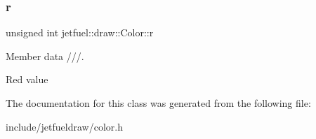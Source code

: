 \subsubsection{\texorpdfstring{r}{r}}
{\footnotesize\ttfamily unsigned int jetfuel\+::draw\+::\+Color\+::r}



Member data ///. 

Red value 

The documentation for this class was generated from the following file\+:\begin{DoxyCompactItemize}
\item 
include/jetfueldraw/color.\+h\end{DoxyCompactItemize}
